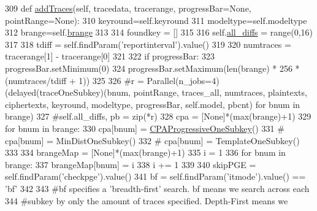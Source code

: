\begin{DoxyCode}
309     \textcolor{keyword}{def }\hyperlink{classsoftware_1_1chipwhisperer_1_1analyzer_1_1attacks_1_1cpa__algorithms_1_1experimentalchannelif6c161da2587ecb2ba5aefd93c43622a_a50294e7f0ed61171af946b7ced09a882}{addTraces}(self, tracedata, tracerange, progressBar=None, pointRange=None):
310         keyround=self.keyround
311         modeltype=self.modeltype
312         brange=self.\hyperlink{classsoftware_1_1chipwhisperer_1_1analyzer_1_1attacks_1_1cpa__algorithms_1_1experimentalchannelif6c161da2587ecb2ba5aefd93c43622a_a6ef4a4594c498869ef09bd4163a64d48}{brange}
313 
314         foundkey = []
315 
316         self.\hyperlink{classsoftware_1_1chipwhisperer_1_1analyzer_1_1attacks_1_1cpa__algorithms_1_1experimentalchannelif6c161da2587ecb2ba5aefd93c43622a_a2547fed7ec4fd8ec24d7e6c4cee83706}{all\_diffs} = range(0,16)
317 
318         tdiff = self.findParam(\textcolor{stringliteral}{'reportinterval'}).value()
319 
320         numtraces = tracerange[1] - tracerange[0]
321 
322         \textcolor{keywordflow}{if} progressBar:
323             progressBar.setMinimum(0)
324             progressBar.setMaximum(len(brange) * 256 * (numtraces/tdiff + 1))
325 
326         \textcolor{comment}{#r = Parallel(n\_jobs=4)(delayed(traceOneSubkey)(bnum, pointRange, traces\_all, numtraces,
       plaintexts, ciphertexts, keyround, modeltype, progressBar, self.model, pbcnt) for bnum in brange)}
327         \textcolor{comment}{#self.all\_diffs, pb = zip(*r)}
328         cpa = [\textcolor{keywordtype}{None}]*(max(brange)+1)
329         \textcolor{keywordflow}{for} bnum \textcolor{keywordflow}{in} brange:
330             cpa[bnum] = \hyperlink{classsoftware_1_1chipwhisperer_1_1analyzer_1_1attacks_1_1cpa__algorithms_1_1experimentalchannelinfo_1_1CPAProgressiveOneSubkey}{CPAProgressiveOneSubkey}()
331             \textcolor{comment}{# cpa[bnum] = MinDistOneSubkey()}
332             \textcolor{comment}{# cpa[bnum] = TemplateOneSubkey()}
333 
334         brangeMap = [\textcolor{keywordtype}{None}]*(max(brange)+1)
335         i = 1
336         \textcolor{keywordflow}{for} bnum \textcolor{keywordflow}{in} brange:
337             brangeMap[bnum] = i
338             i += 1
339 
340         skipPGE = self.findParam(\textcolor{stringliteral}{'checkpge'}).value()
341         bf = self.findParam(\textcolor{stringliteral}{'itmode'}).value() == \textcolor{stringliteral}{'bf'}
342 
343         \textcolor{comment}{#bf specifies a 'breadth-first' search. bf means we search across each}
344         \textcolor{comment}{#subkey by only the amount of traces specified. Depth-First means we}

\end{DoxyCode}
